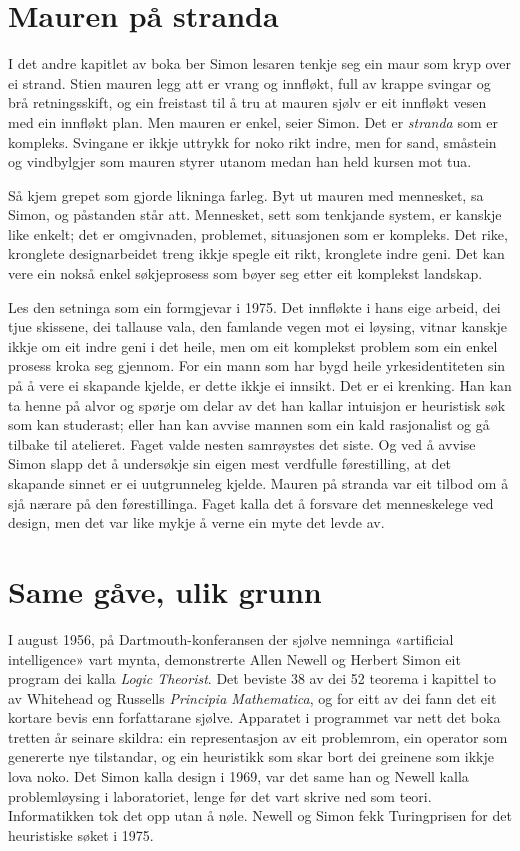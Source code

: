 \section{Mauren på stranda}

I det andre kapitlet av boka ber Simon lesaren tenkje seg ein maur som kryp over ei strand. Stien mauren legg att er vrang og innfløkt, full av krappe svingar og brå retningsskift, og ein freistast til å tru at mauren sjølv er eit innfløkt vesen med ein innfløkt plan. Men mauren er enkel, seier Simon. Det er \emph{stranda} som er kompleks. Svingane er ikkje uttrykk for noko rikt indre, men for sand, småstein og vindbylgjer som mauren styrer utanom medan han held kursen mot tua.

Så kjem grepet som gjorde likninga farleg. Byt ut mauren med mennesket, sa Simon, og påstanden står att. Mennesket, sett som tenkjande system, er kanskje like enkelt; det er omgivnaden, problemet, situasjonen som er kompleks. Det rike, kronglete designarbeidet treng ikkje spegle eit rikt, kronglete indre geni. Det kan vere ein nokså enkel søkjeprosess som bøyer seg etter eit komplekst landskap.

Les den setninga som ein formgjevar i 1975. Det innfløkte i hans eige arbeid, dei tjue skissene, dei tallause vala, den famlande vegen mot ei løysing, vitnar kanskje ikkje om eit indre geni i det heile, men om eit komplekst problem som ein enkel prosess kroka seg gjennom. For ein mann som har bygd heile yrkesidentiteten sin på å vere ei skapande kjelde, er dette ikkje ei innsikt. Det er ei krenking. Han kan ta henne på alvor og spørje om delar av det han kallar intuisjon er heuristisk søk som kan studerast; eller han kan avvise mannen som ein kald rasjonalist og gå tilbake til atelieret. Faget valde nesten samrøystes det siste. Og ved å avvise Simon slapp det å undersøkje sin eigen mest verdfulle førestilling, at det skapande sinnet er ei uutgrunneleg kjelde. Mauren på stranda var eit tilbod om å sjå nærare på den førestillinga. Faget kalla det å forsvare det menneskelege ved design, men det var like mykje å verne ein myte det levde av.

\section{Same gåve, ulik grunn}

I august 1956, på Dartmouth-konferansen der sjølve nemninga «artificial intelligence» vart mynta, demonstrerte Allen Newell og Herbert Simon eit program dei kalla \textit{Logic Theorist}. Det beviste 38 av dei 52 teorema i kapittel to av Whitehead og Russells \textit{Principia Mathematica}, og for eitt av dei fann det eit kortare bevis enn forfattarane sjølve. Apparatet i programmet var nett det boka tretten år seinare skildra: ein representasjon av eit problemrom, ein operator som genererte nye tilstandar, og ein heuristikk som skar bort dei greinene som ikkje lova noko. Det Simon kalla design i 1969, var det same han og Newell kalla problemløysing i laboratoriet, lenge før det vart skrive ned som teori. Informatikken tok det opp utan å nøle. Newell og Simon fekk Turingprisen for det heuristiske søket i 1975.

